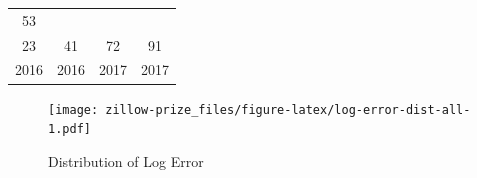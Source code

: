 \documentclass[]{book}
\newenvironment{Shaded}{\begin{snugshade}}{\end{snugshade}}
\newcommand{\KeywordTok}[1]{\textcolor[rgb]{0.13,0.29,0.53}{\textbf{#1}}}
\newcommand{\DataTypeTok}[1]{\textcolor[rgb]{0.13,0.29,0.53}{#1}}
\newcommand{\DecValTok}[1]{\textcolor[rgb]{0.00,0.00,0.81}{#1}}
\newcommand{\FloatTok}[1]{\textcolor[rgb]{0.00,0.00,0.81}{#1}}
\newcommand{\StringTok}[1]{\textcolor[rgb]{0.31,0.60,0.02}{#1}}
\newcommand{\OperatorTok}[1]{\textcolor[rgb]{0.81,0.36,0.00}{\textbf{#1}}}
\newcommand{\NormalTok}[1]{#1}
\theoremstyle{definition}
\theoremstyle{definition}
\theoremstyle{definition}
\theoremstyle{remark}
\begin{document}
\begin{longtable}[]{@{}cccc@{}}
\begin{minipage}[t]{0.10\columnwidth}
53\strut
\end{minipage}\tabularnewline
\begin{minipage}[t]{0.11\columnwidth}\centering\strut
23\strut
\end{minipage} & \begin{minipage}[t]{0.10\columnwidth}\centering\strut
41\strut
\end{minipage} & \begin{minipage}[t]{0.10\columnwidth}\centering\strut
72\strut
\end{minipage} & \begin{minipage}[t]{0.10\columnwidth}\centering\strut
91\strut
\end{minipage}\tabularnewline
\begin{minipage}[t]{0.11\columnwidth}\centering\strut
2016\strut
\end{minipage} & \begin{minipage}[t]{0.10\columnwidth}\centering\strut
2016\strut
\end{minipage} & \begin{minipage}[t]{0.10\columnwidth}\centering\strut
2017\strut
\end{minipage} & \begin{minipage}[t]{0.10\columnwidth}\centering\strut
2017\strut
\end{minipage}\tabularnewline
\bottomrule
\end{longtable}

\begin{Shaded}
\end{Shaded}

\begin{figure}
\centering
\texttt{[image: zillow-prize\_files/figure-latex/log-error-dist-all-1.pdf]}
\caption{\label{fig:log-error-dist-all}Distribution of Log Error}
\end{figure}
\end{document}
